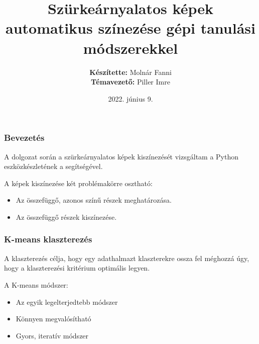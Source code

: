 \documentclass{beamer}
\begin{document}

\title[Szürkeárnyalatos képek automatikus színezése]{Szürkeárnyalatos képek automatikus színezése gépi tanulási módszerekkel}
\author[Molnár Fanni]{\textbf{Készítette:} Molnár Fanni \\ \medskip \textbf{Témavezető:} Piller Imre}
\date{2022. június 9.}

\frame{\titlepage}

\begin{frame}[fragile]
\frametitle{Bevezetés}
A dolgozat során a szürkeárnyalatos képek kiszínezését vizsgáltam a Python eszközkészletének a segítségével.

\bigskip

A képek kiszínezése két problémakörre osztható:
\begin{itemize}
    \item Az összefüggő, azonos színű részek meghatározása.
    \item Az összefüggő részek kiszínezése.
\end{itemize}
\end{frame}

\begin{frame}[fragile]
\frametitle{K-means klaszterezés}
A klaszterezés célja, hogy egy adathalmazt klaszterekre ossza fel méghozzá úgy, hogy a klaszterezési kritérium optimális legyen.

\bigskip

A K-means módszer:
\begin{itemize}
    \item Az egyik legelterjedtebb módszer
    \item Könnyen megvalósítható
    \item Gyors, iteratív módszer
\end{itemize}
\end{frame}
\end{document}
